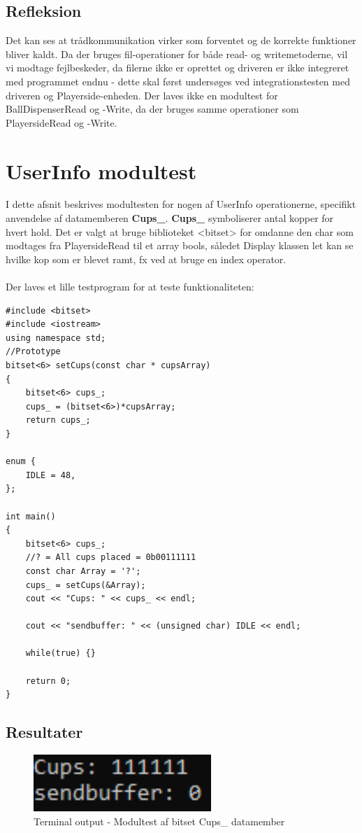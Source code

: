 \documentclass[Modultest/Modultest_main.tex]{subfiles}
\begin{document}
\subsection{Refleksion}
Det kan ses at trådkommunikation virker som forventet og de korrekte funktioner bliver kaldt. Da der bruges fil-operationer for både read- og writemetoderne, vil vi modtage fejlbeskeder, da filerne ikke er oprettet og driveren er ikke integreret med programmet endnu - dette skal først undersøges ved integrationstesten med driveren og Playerside-enheden. 
Der laves ikke en modultest for BallDispenserRead og -Write, da der bruges samme operationer som PlayersideRead og -Write. 
\section{UserInfo modultest}
I dette afsnit beskrives modultesten for nogen af UserInfo operationerne, specifikt anvendelse af datamemberen \textbf{Cups\_}. \textbf{Cups\_} symboliserer antal kopper for hvert hold. Det er valgt at bruge biblioteket <bitset> for omdanne den char som modtages fra PlayersideRead til et array bools, såledet Display klassen let kan se hvilke kop som er blevet ramt, fx ved at bruge en index operator. \\\\
Der laves et lille testprogram for at teste funktionaliteten: 
\begin{lstlisting}
#include <bitset>
#include <iostream>
using namespace std;
//Prototype
bitset<6> setCups(const char * cupsArray)
{
	bitset<6> cups_; 
	cups_ = (bitset<6>)*cupsArray; 
	return cups_; 
}

enum {
	IDLE = 48, 
};

int main()
{
	bitset<6> cups_;
	//? = All cups placed = 0b00111111
	const char Array = '?'; 
	cups_ = setCups(&Array); 
	cout << "Cups: " << cups_ << endl; 

	cout << "sendbuffer: " << (unsigned char) IDLE << endl; 
	
	while(true) {}

	return 0; 
}
\end{lstlisting}
\subsection{Resultater}
\begin{figure}[H]
    \centering
    \includegraphics[width=0.6\textwidth]{Modultest/GameController/graphic/Modultest_userInfo.png}
    \caption{Terminal output - Modultest af bitset Cups_ datamember}
    \label{fig:test_cups}
\end{figure}
\end{document}
